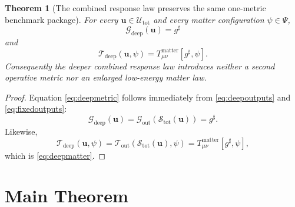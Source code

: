 \documentclass[11pt]{article}
\newcommand{\CompletedMetric}{g^{\sharp}}
\newcommand{\MetricOut}{\mathscr G_{\mathrm{out}}}
\newcommand{\MatterOut}{\mathscr T_{\mathrm{out}}}
\newcommand{\DeepMetricOut}{\mathscr G_{\mathrm{deep}}}
\newcommand{\DeepMatterOut}{\mathscr T_{\mathrm{deep}}}
\newcommand{\DeepShell}{\mathcal U_{\mathrm{tot}}}
\newcommand{\ChainSelectTriple}{\mathcal S_{\mathrm{tot}}}
\newtheorem{theorem}{Theorem}
\begin{document}
\begin{theorem}[The combined response law preserves the same one-metric benchmark package]
\label{thm:outputs}
For every \(\mathbf u\in\DeepShell\) and every matter configuration \(\psi\in\Psi\),
\begin{equation}
\DeepMetricOut(\mathbf u)=\CompletedMetric
\label{eq:deepmetric}
\end{equation}
and
\begin{equation}
\DeepMatterOut(\mathbf u,\psi)
=
T_{\mu\nu}^{\mathrm{matter}}[\CompletedMetric,\psi].
\label{eq:deepmatter}
\end{equation}
Consequently the deeper combined response law introduces neither a second operative metric nor an enlarged low-energy matter law.
\end{theorem}

\begin{proof}
Equation \eqref{eq:deepmetric} follows immediately from \eqref{eq:deepoutputs} and \eqref{eq:fixedoutputs}:
\[
\DeepMetricOut(\mathbf u)
=
\MetricOut(\ChainSelectTriple(\mathbf u))
=
\CompletedMetric.
\]
Likewise,
\[
\DeepMatterOut(\mathbf u,\psi)
=
\MatterOut(\ChainSelectTriple(\mathbf u),\psi)
=
T_{\mu\nu}^{\mathrm{matter}}[\CompletedMetric,\psi],
\]
which is \eqref{eq:deepmatter}.
\end{proof}

\section{Main Theorem}
\end{document}
